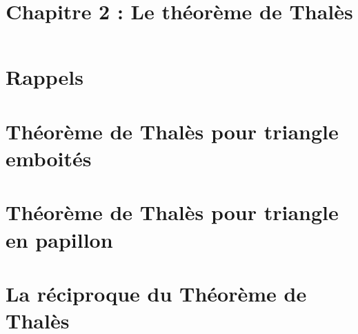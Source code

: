 \title{\vspace{-2em}Chapitre 2 : Le théorème de Thalès\vspace{-3em}}%
\date{ }
\maketitle


\section{Rappels}



\section{Théorème de Thalès pour triangle emboités}



\section{Théorème de Thalès pour triangle en papillon}



\section{La réciproque du Théorème de Thalès}

